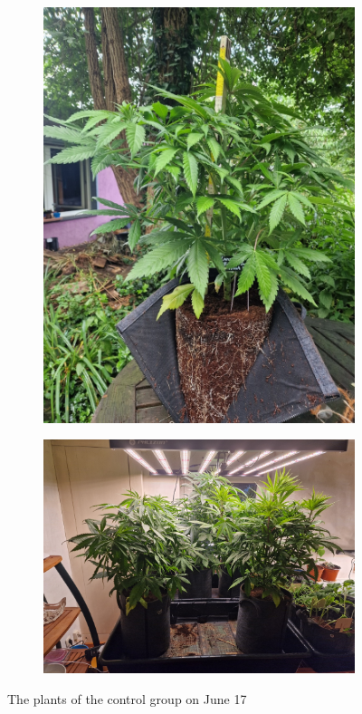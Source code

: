 \begin{figure}[htbp]
\begin{subfigure}[t]{.15\textwidth}
        \includegraphics[width=\linewidth]{plant_12_2024-06-17}
        \label{fig:plant_12_2024-06-17}
    \end{subfigure}
    \begin{subfigure}[t]{.31\textwidth}
        \includegraphics[width=\linewidth]{plant_ctrl_2024-06-17}
        \label{fig:plant_ctrl_2024-06-17}
    \end{subfigure}
    \caption[Plants of the control group on June 17]{The plants of the control group on June 17}
    \label{fig:plants_ctrl_2024-06-17}
\end{figure}

